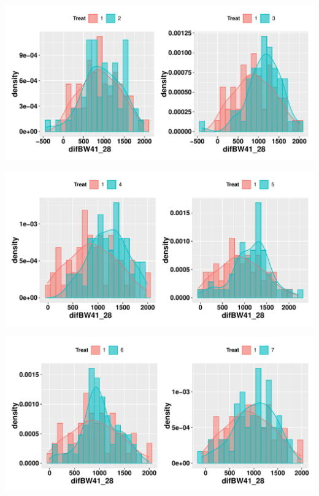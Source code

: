 \documentclass[11pt,a4paper]{article}\usepackage[]{graphicx}\usepackage[]{color}
\makeatletter
\def\maxwidth{ %
  \ifdim\Gin@nat@width>\linewidth
    \linewidth
  \else
    \Gin@nat@width
  \fi
}
\newenvironment{knitrout}{}{} %
\makeatother
\begin{document}
\begin{knitrout}
\color{fgcolor}
\includegraphics[width=\maxwidth]{figure/unnamed-chunk-12-1} 

\includegraphics[width=\maxwidth]{figure/unnamed-chunk-12-2} 

\includegraphics[width=\maxwidth]{figure/unnamed-chunk-12-3} 

\end{knitrout}
\end{document}
